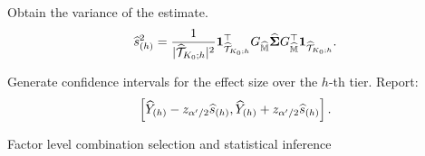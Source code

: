 \documentclass[12pt]{article}
\begin{document}
\begin{algorithm}[!htbp]
{      Obtain the variance of the estimate. 
      \begin{align*}
        \widehat{s}^2_{(h)} = \frac{1}{|\widehat{{\mathcal{T}}}_{K_0;h}|^2} {\boldsymbol{1}}_{\widehat{{\mathcal{T}}}_{K_0;h}}^\top G_{\widehat{{\mathbb{M}}}}\widehat{{\boldsymbol{\Sigma}}}G_{\widehat{{\mathbb{M}}}}^\top{\boldsymbol{1}}_{\widehat{{\mathcal{T}}}_{K_0;h}}.
      \end{align*}

      Generate confidence intervals for the effect size over the $h$-th tier. Report:
      \begin{align*}
         \left[\widehat{Y}_{(h)} - z_{{\alpha'}/{2}}\widehat{s}_{(h)}, \widehat{Y}_{(h)} + z_{{\alpha'}/{2}}\widehat{s}_{(h)}\right].
      \end{align*}
         
    }
    
\caption{Factor level combination selection and statistical inference}
\label{alg:comb-selection}
\end{algorithm}
\end{document}
